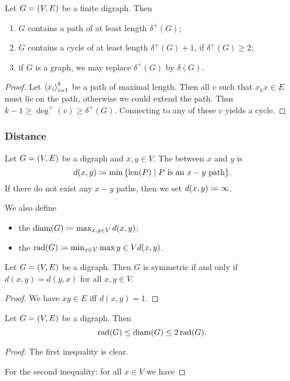 \begin{proposition}
Let $G = \left( V,E \right)$ be a finite digraph. Then
\begin{enumerate}
\item $G$ contains a path of at least length $\delta^+(G)$;
\item $G$ contains a cycle of at least length $\delta^+(G)+ 1$, if $\delta^+(G)\geq 2$;
\item if $G$ is a graph, we may replace $\delta^+(G)$ by $\delta(G)$.
\end{enumerate}
\end{proposition}
\begin{proof}
Let $\left\langle x_i \right\rangle_{i=1}^k$ be a path of maximal length. Then all $v$ such that $x_kx \in E$ must lie on the path, otherwise we could extend the path. Thus $k - 1 \geq \deg^+(v) \geq \delta^+(G)$. Connecting to any of these $v$ yields a cycle.
\end{proof}

\subsubsection{Distance}
\begin{definition}
Let $G = \left( V,E \right)$ be a digraph and $x,y\in V$. The  between $x$ and $y$ is
\[ d(x,y) \defeq \min\setbuilder{\len(P)}{\text{$P$ is an $x-y$ path}}. \]
If there do not exist any $x-y$ paths, then we set $d(x,y) \coloneqq\infty$.

We also define
\begin{itemize}
    \item the  $\operatorname{diam}(G) \coloneqq \max_{x,y\in V} d(x,y)$;
    \item the  $\operatorname{rad}(G) \coloneqq \min_{x\in V}\max{y\in V}d(x,y)$.
\end{itemize}
\end{definition}

\begin{lemma}
Let $G = \left( V,E \right)$ be a digraph. Then $G$ is symmetric \textup{if and only if} $d(x, y) = d(y,x)$ for all $x,y\in V$.
\end{lemma}
\begin{proof}
We have $xy\in E$ iff $d(x,y) = 1$.
\end{proof}

\begin{lemma}
Let $G = \left( V,E \right)$ be a digraph. Then
\[ \operatorname{rad}(G) \leq \operatorname{diam}(G) \leq 2\operatorname{rad}(G). \]
\end{lemma}
\begin{proof}
The first inequality is clear.

For the second inequality: for all $x\in V$ we have 
\end{proof}

